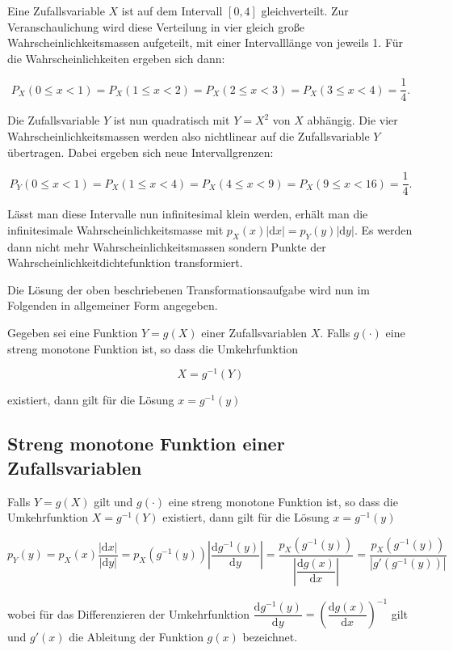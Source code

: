 \begin{beispiel}
Eine Zufallsvariable $X$ ist auf dem Intervall $[0, 4]$ gleichverteilt. Zur Veranschaulichung wird diese Verteilung in vier gleich große Wahrscheinlichkeitsmassen aufgeteilt, mit einer Intervalllänge von jeweils 1. Für die Wahrscheinlichkeiten ergeben sich dann:

$$
P_X(0 \leq x < 1) = P_X(1 \leq x < 2) = P_X(2 \leq x < 3) = P_X(3 \leq x < 4) = \frac{1}{4}.
$$

Die Zufallsvariable $Y$ ist nun quadratisch mit $Y = X^2$ von $X$ abhängig. Die vier Wahrscheinlichkeitsmassen werden also nichtlinear auf die Zufallsvariable $Y$ übertragen. Dabei ergeben sich neue Intervallgrenzen:

$$
P_Y(0 \leq x < 1) = P_X(1 \leq x < 4) = P_X(4 \leq x < 9) = P_X(9 \leq x < 16) = \frac{1}{4}.
$$


Lässt man diese Intervalle nun infinitesimal klein werden, erhält man die infinitesimale Wahrscheinlichkeitsmasse mit $p_X(x)|\mathrm{d}x| = p_Y(y)|\mathrm{d}y|$. Es werden dann nicht mehr Wahrscheinlichkeitsmassen sondern Punkte der Wahrscheinlichkeitdichtefunktion transformiert.
\end{beispiel}

Die Lösung der oben beschriebenen Transformationsaufgabe wird nun im Folgenden in allgemeiner Form angegeben.

Gegeben sei eine Funktion $Y = g(X)$ einer Zufallsvariablen $X$. Falls $g(\cdot)$ eine streng monotone Funktion ist, so dass die Umkehrfunktion

$$
X = g^{-1}(Y)
$$

existiert, dann gilt für die Lösung $x = g^{-1}(y)$

\subsection{Streng monotone Funktion einer Zufallsvariablen}
\label{sec:monotone-transformation}

\begin{satz}
Falls $Y = g(X)$ gilt und $g(\cdot)$ eine streng monotone Funktion ist, so dass die Umkehrfunktion $X = g^{-1}(Y)$ existiert, dann gilt für die Lösung $x = g^{-1}(y)$

$$
p_Y(y) = p_X(x)\frac{|\mathrm{d}x|}{|\mathrm{d}y|} = p_X(g^{-1}(y))\left|\frac{\mathrm{d}g^{-1}(y)}{\mathrm{d}y}\right| = \frac{p_X(g^{-1}(y))}{\left|\dfrac{\mathrm{d}g(x)}{\mathrm{d}x}\right|} = \frac{p_X(g^{-1}(y))}{|g'(g^{-1}(y))|}
$$

wobei für das Differenzieren der Umkehrfunktion $\dfrac{\mathrm{d}g^{-1}(y)}{\mathrm{d}y} = \left(\dfrac{\mathrm{d}g(x)}{\mathrm{d}x}\right)^{-1}$ gilt und $g'(x)$ die Ableitung der Funktion $g(x)$ bezeichnet.
\end{satz}


